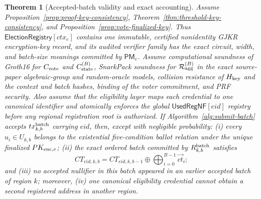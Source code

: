 \documentclass[pdflatex,sn-mathphys-num]{sn-jnl}%
\theoremstyle{thmstyleone}%
\newtheorem{theorem}{Theorem}%
\theoremstyle{thmstyletwo}%
\theoremstyle{thmstylethree}%
\begin{document}
\begin{theorem}[Accepted-batch validity and exact accounting]\label{thm:batch-security}
Assume Proposition~\ref{prop:proof-key-consistency}, Theorem~\ref{thm:threshold-key-consistency}, and Proposition~\ref{prop:vote-finalized-key}. Thus $\mathsf{ElectionRegistry}[ctx_e]$ contains one immutable, certified nonidentity GJKR encryption-key record, and its audited verifier family has the exact circuit, width, and batch-size meanings committed by $\mathsf{PM}_e$. Assume computational soundness of Groth16 for $C_{\rm vote}$ and $C_{\rm state}^{(B)}$, SnarkPack soundness for $\mathcal{R}_{\rm agg}^{(B)}$ in the exact source-paper algebraic-group and random-oracle models, collision resistance of $H_{\rm key}$ and the context and batch hashes, binding of the voter commitment, and PRF security. Also assume that the eligibility layer maps each credential to one canonical identifier and atomically enforces the global $\mathsf{UsedRegNF}[eid]$ registry before any regional registration root is authorized. If Algorithm~\ref{alg:submit-batch} accepts $tx^{\rm batch}_{k,b}$ carrying $eid$, then, except with negligible probability: (i) every $u_i\in U_{k,b}$ belongs to the existential five-condition ballot relation under the unique finalized $PK_{{\rm enc},e}$; (ii) the exact ordered batch committed by $R^{\rm batch}_{k,b}$ satisfies
\[
 CT_{eid,k,b}=CT_{eid,k,b-1}\oplus
 \bigoplus_{i=0}^{B-1}\vec{ct}_i;
\]
and (iii) no accepted nullifier in this batch appeared in an earlier accepted batch of region $k$; moreover, (iv) one canonical eligibility credential cannot obtain a second registered address in another region.
\end{theorem}
\end{document}
